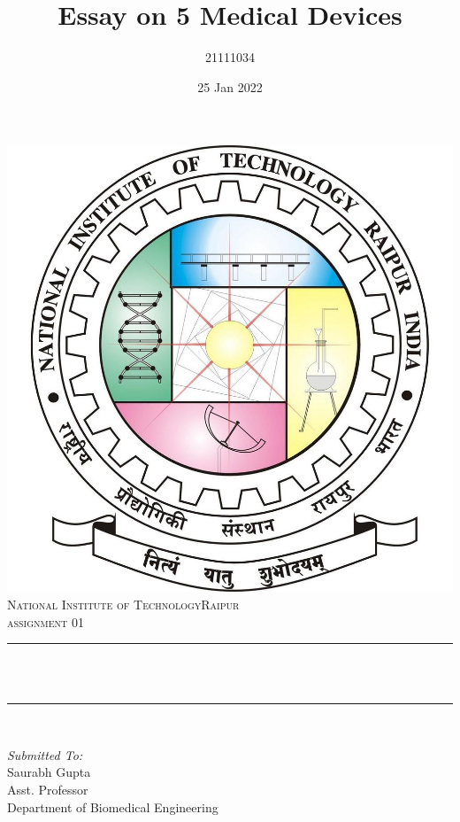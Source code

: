 \documentclass[12pt]{article}
\title{Essay on 5 Medical Devices}								%
\author{21111034}								%
\date{25 Jan 2022}											%
\makeatletter
\let\thetitle\@title
\makeatother
\begin{document}

\begin{titlepage}
	\centering
    \vspace*{0.5 cm}
    \includegraphics[scale = 0.20]{logo.jpeg}\\[1.0 cm]	%
    \textsc{\LARGE  National Institute of Technology\newline\newline Raipur}\\[2.0 cm]	%
	\textsc{\Large assignment 01}\\[0.5 cm]				%
	\rule{\linewidth}{0.2 mm} \\[0.4 cm]
	{ \huge \bfseries \thetitle}\\
	\rule{\linewidth}{0.2 mm} \\[1.5 cm]
	
	\begin{minipage}{0.4\textwidth}
		\begin{flushleft} \large
			\emph{Submitted To:}\\
			Saurabh Gupta\\
            Asst. Professor\\
            Department of Biomedical Engineering\\
			\end{flushleft}
			\end{minipage}~
			\begin{minipage}{0.4\textwidth}
            

\end{minipage}
\end{titlepage}
\end{document}
